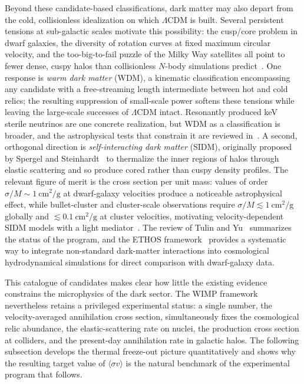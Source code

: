 Beyond these candidate-based classifications, dark matter may also depart from the cold, collisionless idealization on which $\Lambda$CDM is built.
Several persistent tensions at sub-galactic scales motivate this possibility: the cusp/core problem in dwarf galaxies, the diversity of rotation curves at fixed maximum circular velocity, and the too-big-to-fail puzzle of the Milky Way satellites all point to fewer dense, cuspy halos than collisionless $N$-body simulations predict~\cite{Bullock:2017xww}.
One response is \emph{warm dark matter} (WDM), a kinematic classification encompassing any candidate with a free-streaming length intermediate between hot and cold relics; the resulting suppression of small-scale power softens these tensions while leaving the large-scale successes of $\Lambda$CDM intact.
Resonantly produced keV sterile neutrinos are one concrete realization, but WDM as a classification is broader, and the astrophysical tests that constrain it are reviewed in~\cite{Adhikari:2022sbh}.
A second, orthogonal direction is \emph{self-interacting dark matter} (SIDM), originally proposed by Spergel and Steinhardt~\cite{Spergel:1999mh} to thermalize the inner regions of halos through elastic scattering and so produce cored rather than cuspy density profiles.
The relevant figure of merit is the cross section per unit mass: values of order $\sigma/M \sim 1~\mathrm{cm}^2/\mathrm{g}$ at dwarf-galaxy velocities produce a noticeable astrophysical effect, while bullet-cluster and cluster-scale observations require $\sigma/M \lesssim 1~\mathrm{cm}^2/\mathrm{g}$ globally and $\lesssim 0.1~\mathrm{cm}^2/\mathrm{g}$ at cluster velocities, motivating velocity-dependent SIDM models with a light mediator~\cite{Kaplinghat:2015aga}.
The review of Tulin and Yu~\cite{Tulin:2017ara} summarizes the status of the program, and the ETHOS framework~\cite{Cyr-Racine:2015ihg} provides a systematic way to integrate non-standard dark-matter interactions into cosmological hydrodynamical simulations for direct comparison with dwarf-galaxy data.

This catalogue of candidates makes clear how little the existing evidence constrains the microphysics of the dark sector.
The WIMP framework nevertheless retains a privileged experimental status: a single number, the velocity-averaged annihilation cross section, simultaneously fixes the cosmological relic abundance, the elastic-scattering rate on nuclei, the production cross section at colliders, and the present-day annihilation rate in galactic halos.
The following subsection develops the thermal freeze-out picture quantitatively and shows why the resulting target value of $\langle\sigma v\rangle$ is the natural benchmark of the experimental program that follows.

